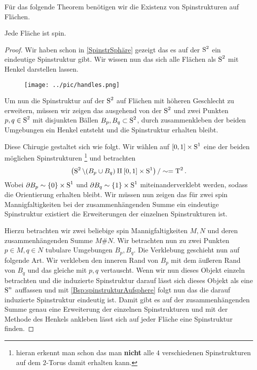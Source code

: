 Für das folgende Theorem benötigen wir die Existenz von Spinstrukturen
auf Flächen.
\begin{Satz}\label{existenzspinflächen}
	Jede Fläche ist spin.
	\begin{proof}
		Wir haben schon in \cref{SpinstrSphäre} gezeigt das es 
		auf der $ \S^2 $ ein eindeutige Spinstruktur gibt. Wir
		wissen nun das sich alle Flächen als $ \S^2 $ mit Henkel 
		darstellen lassen.
		

		\begin{figure}[h]
		\begin{center}
			\texttt{[image: ../pic/handles.png]}
		\end{center}
		\end{figure}
		
		 Um nun die Spinstruktur auf der $ \S^2 $
		auf Flächen mit höheren Geschlecht zu erweitern, müssen
		wir zeigen das ausgehend von der $ \S^2 $ und zwei Punkten
		$ p,q \in\S^2 $ mit disjunkten Bällen $ B_p,B_q \subset\S^2$,
		durch zusammenkleben der beiden Umgebungen ein Henkel
		entsteht und die Spinstruktur erhalten bleibt.
		
		Diese Chirugie gestaltet sich wie folgt. Wir wählen auf
		$ [0,1] \times \S^1 $ eine der beiden möglichen Spinstrukturen \footnote{hieran erkennt man schon das man \textbf{nicht} alle $ 4 $ verschiedenen Spinstrukturen auf dem $ 2 $-Torus damit erhalten kann.} und betrachten 
		\begin{gather*}
		 \left( \S^2 \setminus (B_p \cup B_q) \amalg [0,1]\times \S^1 \right) / \sim = \TT^2.
		\end{gather*}
		Wobei $ \partial B_p \sim \{ 0 \}\times \S^1$ und $ \partial B_q \sim \{ 1 \}\times \S^1$ miteinanderverklebt werden, sodass die Orientierung
		erhalten bleibt.
		Wir müssen nun zeigen das für zwei spin Mannigfaltigkeiten bei 
		der zusammenhängenden Summe ein eindeutige Spinstruktur existiert die 
		Erweiterungen der einzelnen Spinstrukturen ist.
	
		Hierzu betrachten wir zwei beliebige spin Mannigfaltigkeiten $ M,N $ und deren
		zusammenhängenden Summe $ M \# N $. Wir betrachten nun zu zwei Punkten
		$ p\in M,q\in N $ tubulare Umgebungen $ B_p,B_q $. Die Verklebung
		geschieht nun auf folgende Art. Wir verkleben den inneren Rand von $ B_p $
		mit	dem äußeren Rand von $ B_q $ und das gleiche mit $ p,q $ vertauscht.
		Wenn wir nun dieses Objekt einzeln betrachten und die induzierte Spinstruktur darauf lässt sich dieses Objekt als eine $ \S^n $ auffassen
		und mit \cref{Bsp:spinstrukturAufsphere} folgt nun das die darauf
		induzierte Spinstruktur eindeutig ist. Damit gibt es auf
		der zusammenhängenden Summe genau eine Erweiterung der
		einzelnen Spinstrukturen und mit der Methode des Henkels
		ankleben lässt sich auf jeder Fläche eine Spinstruktur finden.
	\end{proof}
\end{Satz}

